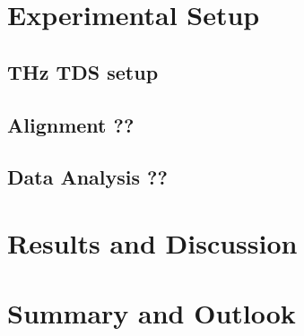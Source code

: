 \documentclass[
	german,%
	accentcolor=9c,%
	ruledheaders=section,%
	class=report,%
	thesis={type=bachelor},%
	fontsize=11pt,%
	parskip=half-,%
	custommargins=false,%
	marginpar=false,%
	BCOR=5mm,%
 	logofile=tools/logo-installation/TUDa-logos/tuda_logo.png,%
]{tudapub}
\begin{document}
\chapter{Experimental Setup}
\section{THz TDS setup}
\section{Alignment ??}
\section{Data Analysis ??}

\chapter{Results and Discussion}

\chapter{Summary and Outlook}

\printbibliography
\end{document}
